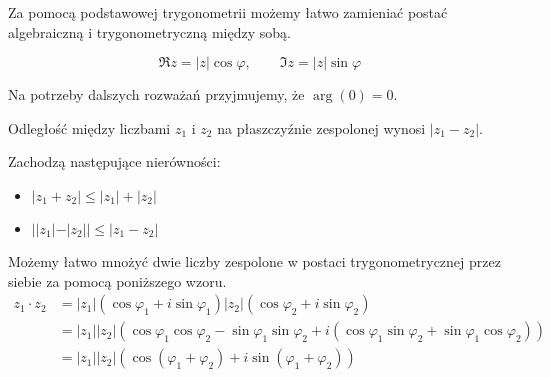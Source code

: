 Za pomocą podstawowej trygonometrii możemy łatwo zamieniać postać algebraiczną i trygonometryczną między sobą.

\begin{center}
\end{center}

\begin{equation}
    \Re{z} = |z|\cos\varphi, \hspace{2em} \Im{z} = |z|\sin\varphi
\end{equation}

Na potrzeby dalszych rozważań przyjmujemy, że $\arg(0) = 0$.

\begin{fact}
    Odległość między liczbami $z_1$ i $z_2$ na płaszczyźnie zespolonej wynosi $|z_1 - z_2|$.
\end{fact}

\begin{lemma}
    Zachodzą następujące nierówności:
    \begin{itemize}
        \item $|z_1 + z_2| \leq |z_1| + |z_2|$
        \item $||z_1| - |z_2|| \leq |z_1 - z_2|$
    \end{itemize}
\end{lemma}

Możemy łatwo mnożyć dwie liczby zespolone w postaci trygonometrycznej przez siebie za pomocą poniższego wzoru.
\begin{equation}
    \label{eq:complex_prod}
    \begin{aligned}
        z_1 \cdot z_2 &= |z_1|(\cos\varphi_1 + i\sin\varphi_1)|z_2|(\cos\varphi_2 + i\sin\varphi_2) \\
                      &= |z_1||z_2|(\cos\varphi_1\cos\varphi_2 - \sin\varphi_1\sin\varphi_2 + i(\cos\varphi_1\sin\varphi_2 + \sin\varphi_1\cos\varphi_2)) \\
                      &= |z_1||z_2|(\cos(\varphi_1 + \varphi_2) + i\sin(\varphi_1 + \varphi_2))
    \end{aligned}
\end{equation}

